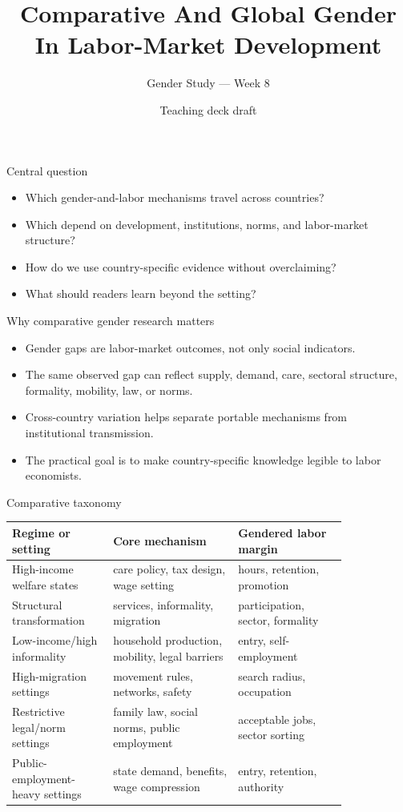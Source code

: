 \documentclass[aspectratio=169,11pt]{beamer}
\title{Comparative And Global Gender In Labor-Market Development}
\subtitle{Gender Study --- Week 8}
\author{Teaching deck draft}
\date{}
\begin{document}
\begin{frame}
  \titlepage
\end{frame}

\begin{frame}{Central question}
\begin{itemize}
    \item Which gender-and-labor mechanisms travel across countries?
    \item Which depend on development, institutions, norms, and labor-market structure?
    \item How do we use country-specific evidence without overclaiming?
    \item What should readers learn beyond the setting?
\end{itemize}
\end{frame}

\begin{frame}{Why comparative gender research matters}
\begin{itemize}
    \item Gender gaps are labor-market outcomes, not only social indicators.
    \item The same observed gap can reflect supply, demand, care, sectoral structure, formality, mobility, law, or norms.
    \item Cross-country variation helps separate portable mechanisms from institutional transmission.
    \item The practical goal is to make country-specific knowledge legible to labor economists.
\end{itemize}
\end{frame}

\begin{frame}{Comparative taxonomy}
\scriptsize
\begin{tabular}{p{0.25\linewidth} p{0.31\linewidth} p{0.27\linewidth}}
\toprule
Regime or setting & Core mechanism & Gendered labor margin \\
\midrule
High-income welfare states & care policy, tax design, wage setting & hours, retention, promotion \\
Structural transformation & services, informality, migration & participation, sector, formality \\
Low-income/high informality & household production, mobility, legal barriers & entry, self-employment \\
High-migration settings & movement rules, networks, safety & search radius, occupation \\
Restrictive legal/norm settings & family law, social norms, public employment & acceptable jobs, sector sorting \\
Public-employment-heavy settings & state demand, benefits, wage compression & entry, retention, authority \\
\bottomrule
\end{tabular}
\end{frame}
\end{document}

